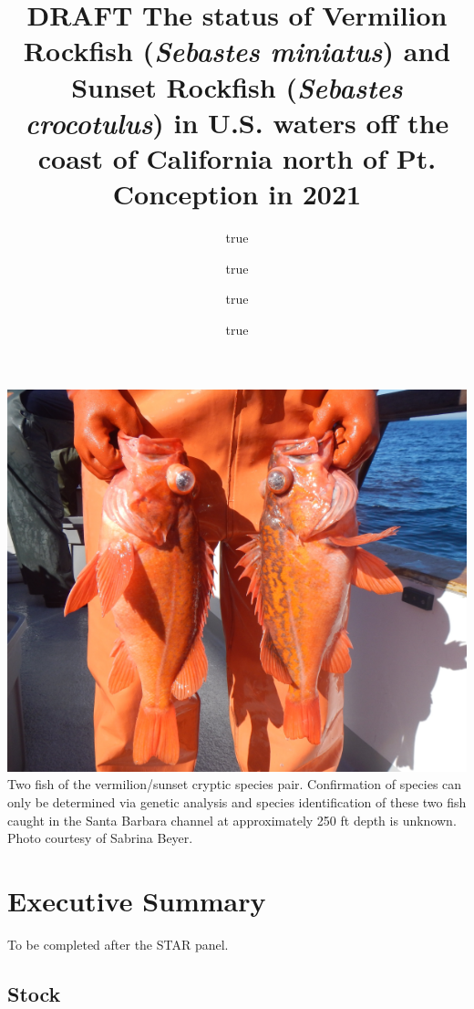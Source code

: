 \documentclass[
  english,
  a4paper,
]{article}
\title{DRAFT The status of Vermilion Rockfish (\emph{Sebastes miniatus}) and Sunset Rockfish (\emph{Sebastes crocotulus}) in U.S. waters off the coast of California north of Pt. Conception in 2021}
\author{true \and true \and true \and true}
\date{}
\begin{document}
\maketitle

{
\setcounter{tocdepth}{2}
\tableofcontents
}
\newcommand\CapeM{$40^\circ 10^\prime N$}
\newcommand\PtC{$34^\circ 27^\prime N$}
\newcommand\CAOR{$42^\circ 00^\prime N$}

\newpage

\includegraphics{cover_photo.png}
Two fish of the vermilion/sunset cryptic species pair. Confirmation of
species can only be determined via genetic analysis and species identification
of these two fish caught in the Santa Barbara channel at approximately 250 ft depth
is unknown. Photo courtesy of Sabrina Beyer.

\pagebreak
{}
\setcounter{page}{1}

\renewcommand{\thetable}{\roman{table}}
\renewcommand{\thefigure}{\roman{figure}}

\setlength\parskip{0.5em plus 0.1em minus 0.2em}

\hypertarget{executive-summary}{%
\section*{Executive Summary}\label{executive-summary}}

To be completed after the STAR panel.

\hypertarget{stock}{%
\subsection*{Stock}\label{stock}}
\end{document}
